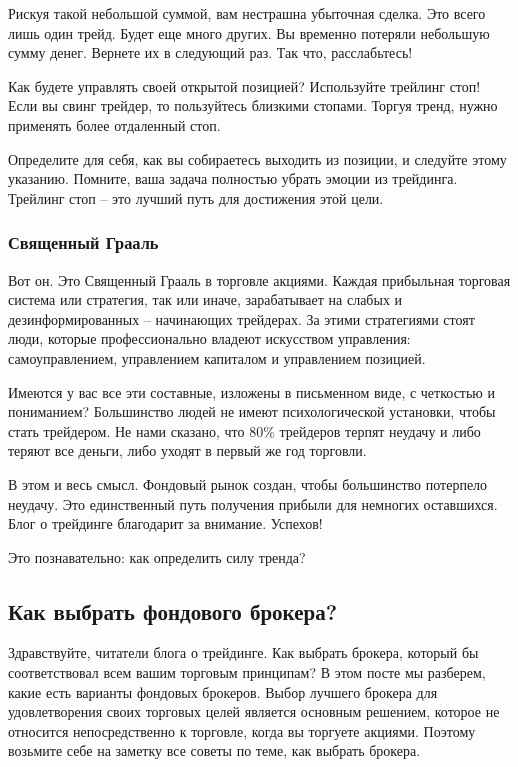 \documentclass{book}
\begin{document}
Рискуя такой небольшой суммой, вам нестрашна убыточная сделка. Это всего лишь один трейд. Будет еще много других. Вы временно потеряли небольшую сумму денег. Вернете их в следующий раз. Так что, расслабьтесь!

Как будете управлять своей открытой позицией? Используйте трейлинг стоп! Если вы свинг трейдер, то пользуйтесь близкими стопами. Торгуя тренд, нужно применять более отдаленный стоп.

Определите для себя, как вы собираетесь выходить из позиции, и
следуйте этому указанию. Помните, ваша задача полностью убрать эмоции
из трейдинга. Трейлинг стоп – это лучший путь для достижения этой
цели.

\subsubsection{Священный Грааль}

Вот он. Это Священный Грааль в торговле акциями. Каждая прибыльная торговая система или стратегия, так или иначе, зарабатывает на слабых и дезинформированных – начинающих трейдерах. За этими стратегиями стоят люди, которые профессионально владеют искусством управления: самоуправлением, управлением капиталом и управлением позицией.

Имеются у вас все эти составные, изложены в письменном виде, с четкостью и пониманием? Большинство людей не имеют психологической установки, чтобы стать трейдером. Не нами сказано, что 80\% трейдеров терпят неудачу и либо теряют все деньги, либо уходят в первый же год торговли.

В этом и весь смысл. Фондовый рынок создан, чтобы большинство потерпело неудачу. Это единственный путь получения прибыли для немногих оставшихся. Блог о трейдинге благодарит за внимание. Успехов!


Это познавательно: как определить силу тренда?

\subsection{Как выбрать фондового брокера?}


Здравствуйте, читатели блога о трейдинге. Как выбрать брокера, который
бы соответствовал всем вашим торговым принципам? В этом посте мы
разберем, какие есть варианты фондовых брокеров. Выбор лучшего брокера
для удовлетворения своих торговых целей является основным решением,
которое не относится непосредственно к торговле, когда вы торгуете
акциями. Поэтому возьмите себе на заметку все советы по теме, как
выбрать брокера.
\end{document}
